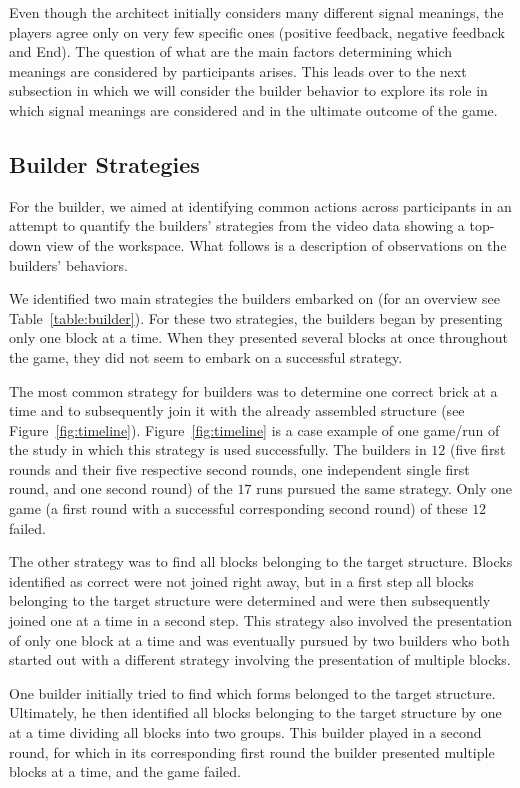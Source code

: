 Even though the architect initially considers many different signal meanings, the players agree only on very few specific ones (positive feedback, negative feedback and End). The question of what are the main factors determining which meanings are considered by participants arises. This leads over to the next subsection in which we will consider the builder behavior to explore its role in which signal meanings are considered and in the ultimate outcome of the game.

\subsection{Builder Strategies}
\label{sec:builder}

For the builder, we aimed at identifying common actions across participants in an attempt to quantify the builders' strategies from the video data showing a top-down view of the workspace.
What follows is a description of observations on the builders' behaviors.

We identified two main strategies the builders embarked on (for an overview see Table~\ref{table:builder}). For these two strategies, the builders began by presenting only one block at a time. When they presented several blocks at once throughout the game, they did not seem to embark on a successful strategy.

The most common strategy for builders was to determine one correct brick at a time and to subsequently join it with the already assembled structure (see Figure~\ref{fig:timeline}). Figure~\ref{fig:timeline} is a case example of one game/run of the study in which this strategy is used successfully. The builders in $12$ (five first rounds and their five respective second rounds, one independent single first round, and one second round) of the $17$ runs pursued the same strategy. Only one game (a first round with a successful corresponding second round) of these $12$ failed.

The other strategy was to find all blocks belonging to the target structure. Blocks identified as correct were not joined right away, but in a first step all blocks belonging to the target structure were determined and were then subsequently joined one at a time in a second step. This strategy also involved the presentation of only one block at a time and was eventually pursued by two builders who both started out with a different strategy involving the presentation of multiple blocks. 

One builder initially tried to find which forms belonged to the target structure. Ultimately, he then identified all blocks belonging to the target structure by one at a time dividing all blocks into two groups. This builder played in a second round, for which in its corresponding first round the builder presented multiple blocks at a time, and the game failed.

